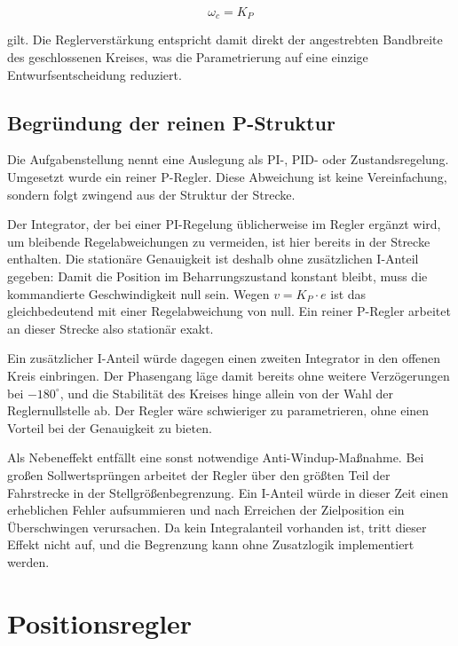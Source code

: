\begin{equation}
    \omega_c = K_P
    \label{eq:durchtritt}
\end{equation}

gilt. Die Reglerverstärkung entspricht damit direkt der angestrebten Bandbreite des
geschlossenen Kreises, was die Parametrierung auf eine einzige Entwurfsentscheidung
reduziert.

\subsection*{Begründung der reinen P-Struktur}

Die Aufgabenstellung nennt eine Auslegung als PI-, PID- oder Zustandsregelung. Umgesetzt
wurde ein reiner P-Regler. Diese Abweichung ist keine Vereinfachung, sondern folgt
zwingend aus der Struktur der Strecke.

Der Integrator, der bei einer PI-Regelung üblicherweise im Regler ergänzt wird, um
bleibende Regelabweichungen zu vermeiden, ist hier bereits in der Strecke enthalten. Die
stationäre Genauigkeit ist deshalb ohne zusätzlichen I-Anteil gegeben: Damit die Position
im Beharrungszustand konstant bleibt, muss die kommandierte Geschwindigkeit null sein.
Wegen $v = K_P \cdot e$ ist das gleichbedeutend mit einer Regelabweichung von null. Ein
reiner P-Regler arbeitet an dieser Strecke also stationär exakt.

Ein zusätzlicher I-Anteil würde dagegen einen zweiten Integrator in den offenen Kreis
einbringen. Der Phasengang läge damit bereits ohne weitere Verzögerungen bei
$-180^\circ$, und die Stabilität des Kreises hinge allein von der Wahl der
Reglernullstelle ab. Der Regler wäre schwieriger zu parametrieren, ohne einen Vorteil bei
der Genauigkeit zu bieten.

Als Nebeneffekt entfällt eine sonst notwendige Anti-Windup-Maßnahme. Bei großen
Sollwertsprüngen arbeitet der Regler über den größten Teil der Fahrstrecke in der
Stellgrößenbegrenzung. Ein I-Anteil würde in dieser Zeit einen erheblichen Fehler
aufsummieren und nach Erreichen der Zielposition ein Überschwingen verursachen. Da kein
Integralanteil vorhanden ist, tritt dieser Effekt nicht auf, und die Begrenzung kann ohne
Zusatzlogik implementiert werden.

\section{Positionsregler}
\label{sec:positionsregler}

